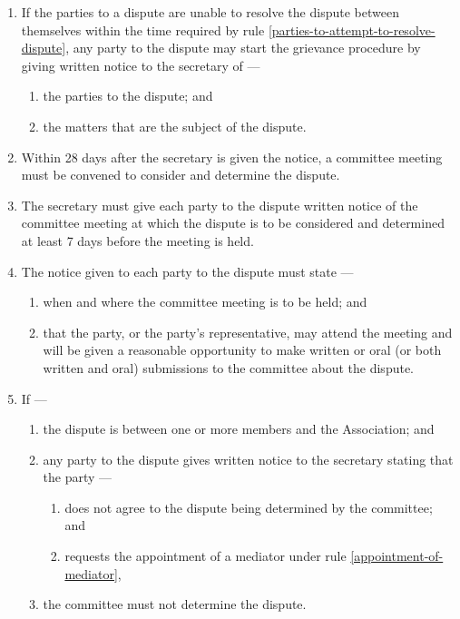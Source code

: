 \documentclass[../constitution.tex]{subfiles}
\begin{document}
\begin{enumerate}

\item If the parties to a dispute are unable to resolve the dispute between themselves within the time required by rule \ref{parties-to-attempt-to-resolve-dispute}, any party to the dispute may start the grievance procedure by giving written notice to the secretary of ---

  \begin{enumerate}
  
  \item the parties to the dispute; and
  \item the matters that are the subject of the dispute.
  \end{enumerate}
\item Within 28 days after the secretary is given the notice, a committee meeting must be convened to consider and determine the dispute.
\item The secretary must give each party to the dispute written notice of the committee meeting at which the dispute is to be considered and determined at least 7 days before the meeting is held.
\item The notice given to each party to the dispute must state ---

  \begin{enumerate}
  
  \item when and where the committee meeting is to be held; and
  \item that the party, or the party's representative, may attend the meeting and will be given a reasonable opportunity to make written or oral (or both written and oral) submissions to the committee about the dispute.
  \end{enumerate}
\item If ---

  \begin{enumerate}
  
  \item the dispute is between one or more members and the Association; and
  \item any party to the dispute gives written notice to the secretary stating that the party ---

    \begin{enumerate}
    
    \item does not agree to the dispute being determined by the committee; and
    \item requests the appointment of a mediator under rule \ref{appointment-of-mediator}, \label{grievance-appoint-mediator}
    \end{enumerate}
  \item the committee must not determine the dispute.
  \end{enumerate}
\end{enumerate}
\end{document}
